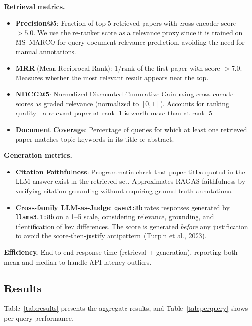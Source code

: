 \documentclass[11pt,a4paper]{article}
\begin{document}
\textbf{Retrieval metrics.}
\begin{itemize}
  \item \textbf{Precision@5}: Fraction of top-5 retrieved papers with cross-encoder score $>5.0$. We use the re-ranker score as a relevance proxy since it is trained on MS~MARCO for query-document relevance prediction, avoiding the need for manual annotations.
  \item \textbf{MRR} (Mean Reciprocal Rank): $1/\text{rank}$ of the first paper with score $>7.0$. Measures whether the most relevant result appears near the top.
  \item \textbf{NDCG@5}: Normalized Discounted Cumulative Gain using cross-encoder scores as graded relevance (normalized to $[0,1]$). Accounts for ranking quality---a relevant paper at rank~1 is worth more than at rank~5.
  \item \textbf{Document Coverage}: Percentage of queries for which at least one retrieved paper matches topic keywords in its title or abstract.
\end{itemize}

\textbf{Generation metrics.}
\begin{itemize}
  \item \textbf{Citation Faithfulness}: Programmatic check that paper titles quoted in the LLM answer exist in the retrieved set. Approximates RAGAS faithfulness by verifying citation grounding without requiring ground-truth annotations.
  \item \textbf{Cross-family LLM-as-Judge}: \texttt{qwen3:8b} rates responses generated by \texttt{llama3.1:8b} on a 1--5 scale, considering relevance, grounding, and identification of key differences. The score is generated \emph{before} any justification to avoid the score-then-justify antipattern~(Turpin et al., 2023).
\end{itemize}

\textbf{Efficiency.} End-to-end response time (retrieval + generation), reporting both mean and median to handle API latency outliers.

\subsection{Results}

Table~\ref{tab:results} presents the aggregate results, and Table~\ref{tab:perquery} shows per-query performance.
\end{document}
